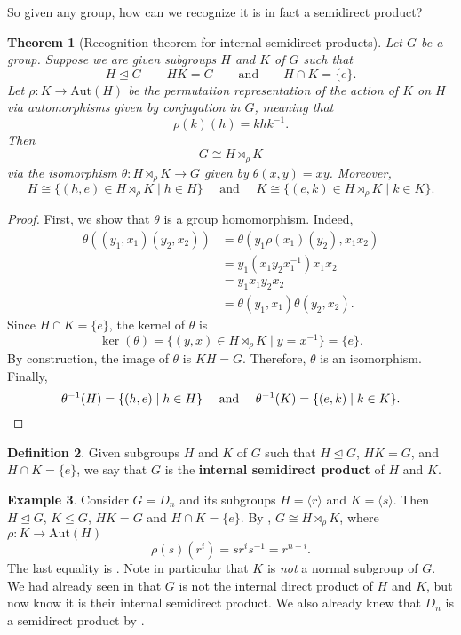 \documentclass[12pt]{report}
\newtheorem{theorem}{Theorem}[chapter]
\numberwithin{equation}{section}
\numberwithin{theorem}{chapter}
\theoremstyle{definition}
\newtheorem{definition}[theorem]{Definition}
\newtheorem{example}[theorem]{Example}
\newtheorem*{basic properties}{Basic Properties}
\newtheorem*{Important Remark}{Important Remark}
\newcommand{\df}[1]{{\bf #1}\index{#1}}
\def\sdp{\rtimes}
\renewcommand{\ker}{\operatorname{ker}}
\begin{document}
So given any group, how can we recognize it is in fact a semidirect product?


\begin{theorem}[Recognition theorem for internal semidirect products]\label{semidirect product recognition}
Let $G$ be a group. Suppose we are given subgroups $H$ and $K$ of $G$ such that
$$H \trianglelefteq G \qquad HK = G \qquad \text{and} \qquad H \cap K = \{e\}.$$
Let $\rho\!: K \to \mathrm{Aut}(H)$ be the permutation representation of the action of $K$ on $H$ via automorphisms given by conjugation in $G$, meaning that
$$\rho(k)(h) = khk^{-1}.$$
Then 
$$G \cong H \sdp_\rho K$$
via the isomorphism $\theta\!: H \sdp_\rho K \to G$ given by $\theta(x,y) = xy$. Moreover, 
$$H \cong \{(h,e) \in H \sdp_\rho K \mid h\in H\} \quad \text{ and } \quad K \cong \{(e,k) \in H \sdp_\rho K \mid k\in K\}.$$
\end{theorem}

\begin{proof}
First, we show that $\theta$ is a group homomorphism. Indeed,
$$\begin{aligned}
\theta((y_1, x_1) (y_2, x_2)) & = 
\theta(y_1 \rho(x_1)(y_2), x_1 x_2) \\
& = y_1(x_1y_2x_1^{-1}) x_1 x_2 \\
& = y_1x_1y_2x_2 \\
& = \theta(y_1, x_1) \theta(y_2, x_2).
\end{aligned}$$
Since $H \cap K = \{e\}$, the kernel of $\theta$ is 
$$\ker(\theta) = \{(y,x) \in H \sdp_{\rho} K \mid y = x^{-1} \} = \{ e \}.$$
By construction, the image of $\theta$ is $KH = G$. Therefore, $\theta$ is an isomorphism. Finally, 
$$\theta^{-1}(H) = \{(h,e)\mid h\in H\} \quad \text{ and } \quad \theta^{-1}(K) = \{(e,k)\mid k\in K\}.\qedhere$$
\end{proof}


\begin{definition} 
Given subgroups $H$ and $K$ of $G$ such that $H \trianglelefteq G$, $HK = G$, and $H \cap K = \{e\}$, we say that $G$ is the \df{internal semidirect product} of $H$ and $K$.
\end{definition}

\begin{example}\label{D_n is a semidirect product part II}
Consider $G = D_{n}$ and its subgroups $H = \langle r \rangle$ and $K = \langle s \rangle$. Then $H \trianglelefteq G$, $K \leq G$, $HK = G$ and $H \cap K = \{e\}$. By , $G \cong H \sdp_{\rho} K$, where $\rho\!: K \to \mathrm{Aut}(H)$
$$\rho(s)(r^i) = sr^is^{-1} = r^{n-i}.$$
The last equality is .
Note in particular that $K$ is \emph{not} a normal subgroup of $G$.
We had already seen in  that $G$ is not the internal direct product of $H$ and $K$, but now know it is their internal semidirect product. We also already knew that $D_n$ is a semidirect product by .
\end{example}
\end{document}
